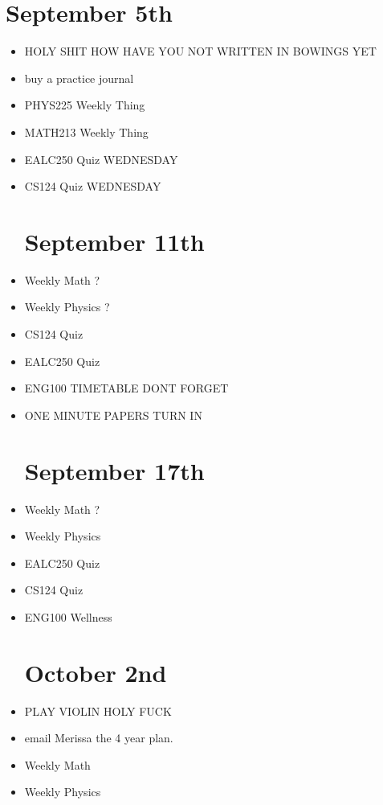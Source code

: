 \documentclass{report}
\newcommand{\done}{\textbf{\checkmark}}
\begin{document}
\chapter{September 5th}
\begin{itemize}
\item
HOLY SHIT HOW HAVE YOU NOT WRITTEN IN BOWINGS YET \done
\item
buy a practice journal \done
\item
PHYS225 Weekly Thing \done
\item
MATH213 Weekly Thing \done
\item
EALC250 Quiz WEDNESDAY \done
\item
CS124 Quiz WEDNESDAY \done



\chapter{September 11th}
\item
Weekly Math \done ?
\item
Weekly Physics \done ?
\item
CS124 Quiz \done
\item
EALC250 Quiz
\item
ENG100 TIMETABLE DONT FORGET \done
\item
ONE MINUTE PAPERS TURN IN

\chapter{September 17th}
\item
Weekly Math \done ?
\item
Weekly Physics
\item
EALC250 Quiz
\item
CS124 Quiz \done
\item
ENG100 Wellness \done


\chapter{October 2nd}
\item
PLAY VIOLIN HOLY FUCK

\item
email Merissa the 4 year plan. \done

\item
Weekly Math \done

\item
Weekly Physics \done


\end{itemize}
\end{document}
